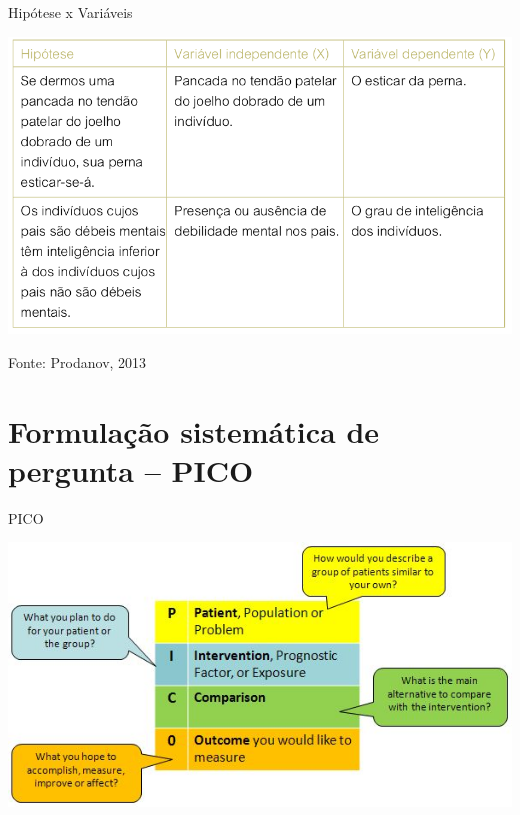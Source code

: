 \documentclass{beamer}
\begin{document}
\begin{frame}{Hipótese x Variáveis}
  \begin{center}
  \includegraphics[height=0.8\textheight]{Hipoteses_variaveis/hipotese_variaveis}
\end{center}

  \vfill
  \scriptsize
  \hfill Fonte: Prodanov, 2013
\end{frame}

\section{Formulação sistemática de pergunta -- PICO}

\begin{frame}{PICO}
  \begin{center}
    \includegraphics[height=0.8\textheight]{Hipoteses_variaveis/pico}
  \end{center}
\end{frame}
\end{document}
